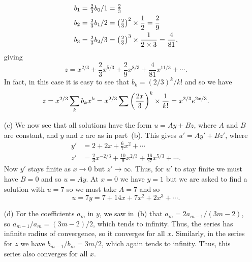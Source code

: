\documentclass[a4paper]{amsart}
\begin{document}
\begin{solution}
\begin{itemize}
   \begin{align*}
    b_1 &= \tfrac{2}{3}b_0/1 
         = \tfrac{2}{3} \\
    b_2 &= \tfrac{2}{3}b_1/2 
         = \left(\tfrac{2}{3}\right)^2\times\frac{1}{2} 
         = \frac{2}{9} \\
    b_3 &= \tfrac{2}{3}b_2/3 
         = \left(\tfrac{2}{3}\right)^3\times\frac{1}{2\times 3} 
         = \frac{4}{81},  
   \end{align*}
   giving 
   \[ z = x^{2/3} + \frac{2}{3} x^{5/3} + \frac{2}{9} x^{8/3} +
          \frac{4}{81}x^{11/3} + \dotsb.
   \]
   In fact, in this case it is easy to see that $b_k=(2/3)^k/k!$ and so
   we have
   \[ z = x^{2/3}\sum_kb_kx^k 
        = x^{2/3}\sum \left(\frac{2x}{3}\right)^k\times \frac{1}{k!}
        = x^{2/3} e^{2x/3}.
   \]
  \item[(c)] We now see that all solutions have the form $u=Ay+Bz$,
   where $A$ and $B$ are constant, and $y$ and $z$ are as in
   part~(b).  This gives $u'=Ay'+Bz'$, where
   \begin{align*}
    y' &= 2 + 2x + \tfrac{6}{7}x^2 + \dotsb \\
    z' &= \tfrac{2}{3}x^{-2/3} + \tfrac{10}{9}x^{2/3} +
           \frac{16}{27}x^{5/3} + \dotsb. 
   \end{align*}
   Now $y'$ stays finite as $x\to 0$ but $z'\to\infty$.  Thus, for
   $u'$ to stay finite we must have $B=0$ and so $u=Ay$.  At $x=0$ we
   have $y=1$ but we are asked to find a solution with $u=7$ so we
   must take $A=7$ and so
   \[ u = 7y = 7 + 14x + 7x^2 + 2x^3 + \dotsb. \]
  
  \item[(d)] For the coefficients $a_m$ in $y$, we saw in~(b) that
   $a_m=2a_{m-1}/(3m-2)$, so $a_{m-1}/a_m=(3m-2)/2$, which tends to
   infinity.  Thus, the series has infinite radius of convergence, so
   it converges for all $x$.  Similarly, in the series for $z$ we have 
   $b_{m-1}/b_m=3m/2$, which again tends to infinity.  Thus, this
   series also converges for all $x$.
 \end{itemize}
\end{solution}
\end{document}

